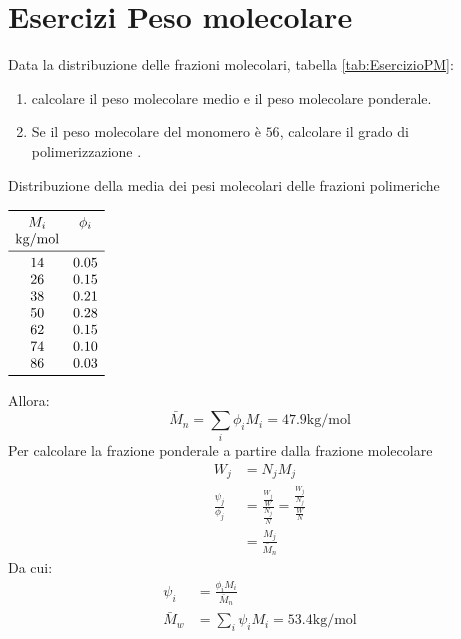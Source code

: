\chapter{Esercizi Peso molecolare}\label{chp:EsercizioPM}
Data la distribuzione delle frazioni molecolari, tabella \ref{tab:EsercizioPM}: 
\begin{enumerate}
\item calcolare il peso molecolare medio e il peso molecolare ponderale.
\item Se il peso molecolare del monomero è $56$, calcolare il grado di polimerizzazione .
\end{enumerate}

\begin{table}
\caption{Distribuzione della media dei pesi molecolari delle frazioni polimeriche}
\label{tab:EsercizioPM}
$
\begin{array}{cc}
\toprule
M_i & \phi_i\\
\unit{\kg/\mol} & \\
\midrule
14 & 0.05\\
26 & 0.15\\
38 & 0.21\\
50 & 0.28\\
62 & 0.15\\
74 & 0.10\\
86 & 0.03\\
\bottomrule
\end{array}
$
\end{table}
Allora:
\begin{equation}
\bar{M}_n = \sum_i{\phi_iM_i} = 47.9\unit{\kg/\mol}
\end{equation}
Per calcolare la frazione ponderale a partire dalla frazione molecolare
\begin{equation}
\begin{split}
W_j &= N_j M_j\\
\frac{\psi_j}{\phi_j} &= \frac{\frac{W_j}{W}}{\frac{N_j}{N}} = \frac{\frac{W_j}{N_j}}{\frac{W}{N}}\\
&=\frac{M_j}{\bar{M}_n}
\end{split}
\end{equation}
Da cui:
\begin{equation}
\begin{split}
\psi_i &= \frac{\phi_iM_i}{\bar{M}_n}\\
\bar{M}_w &= \sum_i{\psi_iM_i} = 53.4\unit{\kg/\mol}
\end{split}
\end{equation}
